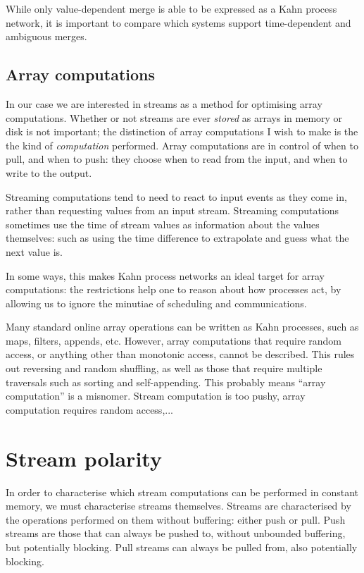 While only value-dependent merge is able to be expressed as a Kahn process network, it is important to compare which systems support time-dependent and ambiguous merges.

\subsection{Array computations}

In our case we are interested in streams as a method for optimising array computations.
Whether or not streams are ever \emph{stored} as arrays in memory or disk is not important; the distinction of array computations I wish to make is the the kind of \emph{computation} performed.
Array computations are in control of when to pull, and when to push: they choose when to read from the input, and when to write to the output.

Streaming computations tend to need to react to input events as they come in, rather than requesting values from an input stream.
Streaming computations sometimes use the time of stream values as information about the values themselves: such as using the time difference to extrapolate and guess what the next value is.

In some ways, this makes Kahn process networks an ideal target for array computations: the restrictions help one to reason about how processes act, by allowing us to ignore the minutiae of scheduling and communications.

Many standard online array operations can be written as Kahn processes, such as maps, filters, appends, etc.
However, array computations that require random access, or anything other than monotonic access, cannot be described.
This rules out reversing and random shuffling, as well as those that require multiple traversals such as sorting and self-appending.
This probably means ``array computation'' is a misnomer.
Stream computation is too pushy, array computation requires random access,...

\section{Stream polarity}

In order to characterise which stream computations can be performed in constant memory, we must characterise streams themselves.
Streams are characterised by the operations performed on them without buffering: either push or pull.
Push streams are those that can always be pushed to, without unbounded buffering, but potentially blocking.
Pull streams can always be pulled from, also potentially blocking.

